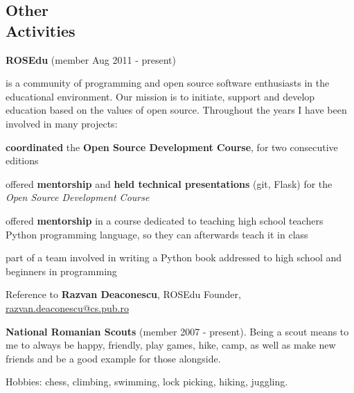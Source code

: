 \documentclass[margin,line]{resume}
\begin{document}
\begin{resume}
   \pagebreak

    \section{\mysidestyle Other\\Activities}

    \textbf{ROSEdu} (member Aug 2011 - present)
    {\fontsize{2.65mm}{1em}\selectfont
      is a community of
      programming and open source software enthusiasts in the educational environment. Our mission is to
      initiate, support and develop education based on the values of open source.\vspace{1mm}
      Throughout the years I have been involved in many projects:
      \begin{list2}
          \item \textbf{coordinated} the \textbf{Open Source Development Course}, for two consecutive editions
          \item offered \textbf{mentorship} and \textbf{held technical presentations} (git, Flask) for the \textit{Open Source Development Course}
          \item offered \textbf{mentorship} in a course dedicated to teaching high school teachers Python programming language, so they can afterwards teach it in class
          \item part of a team involved in writing a Python book addressed to high school and beginners in programming
      \end{list2}\vspace{-3.5mm}
      Reference to \textbf{Razvan Deaconescu}, ROSEdu Founder, \href{mailto:razvan.deaconescu@cs.pub.ro}{razvan.deaconescu@cs.pub.ro}
    }\vspace{-1mm}

    \textbf{National Romanian Scouts} (member 2007 - present).
    {\fontsize{2.65mm}{1em}\selectfont
      Being a scout means to me to always be happy, friendly, play games, hike, camp, as well as make new friends and be a good example for those alongside.
    }\vspace{-1mm}

    Hobbies: chess, climbing, swimming, lock picking, hiking, juggling.



\end{resume}
\end{document}
